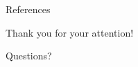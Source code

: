 \documentclass{beamer}
\begin{document}
%
%

\begin{frame}[allowframebreaks]{References}



\end{frame}

\begin{frame}
\centering
\Huge Thank you for your attention!
\end{frame}


\begin{frame}
\centering
\Huge Questions?
\end{frame}

\end{document}
